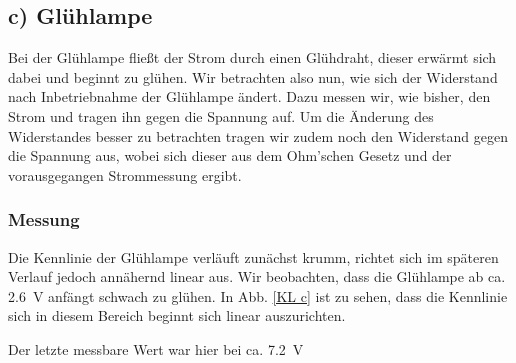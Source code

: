 \documentclass[11pt,a4paper,titlepage, ngerman]{article}
\begin{document}
		\subsection{c) Glühlampe} 
			
			Bei der Glühlampe fließt der Strom durch einen Glühdraht, dieser erwärmt sich dabei und beginnt zu glühen. Wir betrachten also nun, wie sich der Widerstand nach Inbetriebnahme der Glühlampe ändert. Dazu messen wir, wie bisher, den Strom und tragen ihn gegen die Spannung auf. Um die Änderung des Widerstandes besser zu betrachten tragen wir zudem noch den Widerstand gegen die Spannung aus, wobei sich dieser aus dem Ohm'schen Gesetz und der vorausgegangen Strommessung ergibt.  
			
			\subsubsection{Messung}
				
				Die Kennlinie der Glühlampe verläuft zunächst krumm, richtet sich im späteren Verlauf jedoch annähernd linear aus. Wir beobachten, dass die Glühlampe ab ca. \SI{2.6}{\V} anfängt schwach zu glühen. In Abb. \ref{KL c} ist zu sehen, dass die Kennlinie sich in diesem Bereich beginnt sich linear auszurichten.
				
				Der letzte messbare Wert war hier bei ca. \SI{7.2}{\V}
				
\end{document}
